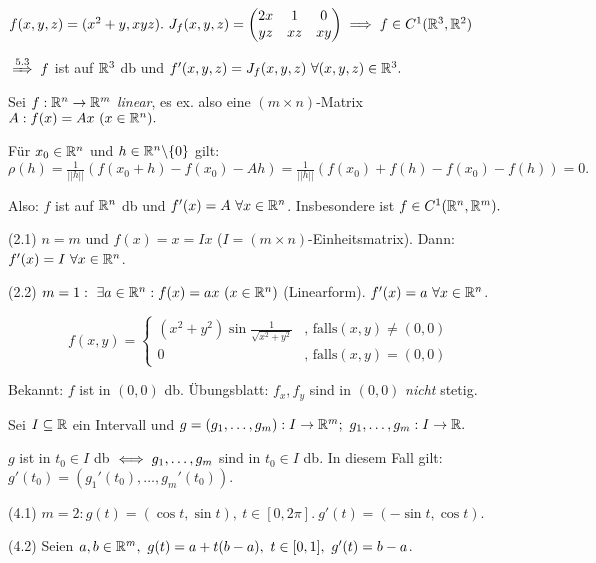\documentclass[a4paper,twoside,DIV15,BCOR12mm,chapterprefix=true,headings=twolinechapter]{scrbook}
\begin{document}
\begin{beispiele}
\item $f(x,y,z) = (x^2+y, xyz).\ J_f(x,y,z) = \begin{pmatrix}
2x & 1 & 0\\
yz & xz & xy\end{pmatrix} \implies f \in C^1(\mathbb{R}^3,\mathbb{R}^2)$

$\folgtnach{5.3} f$ ist auf $\mathbb{R}^3$ db und $f'(x,y,z) = J_f(x,y,z)\ \forall (x,y,z) \in \mathbb{R}^3.$

\item Sei $f:\mathbb{R}^n \to \mathbb{R}^m$ \emph{linear}, es ex. also eine $(m \times n)$-Matrix $A:f(x) = Ax\ (x \in \mathbb{R}^n).$

Für $x_0 \in \mathbb{R}^n$ und $h \in \mathbb{R}^n \backslash\{0\}$ gilt:\\
$\rho(h) = \frac{1}{||h||}(f(x_0+h) - f(x_0) - Ah) = \frac{1}{||h||}(f(x_0) + f(h) - f(x_0) - f(h)) = 0.$

Also: $f$ ist auf $\mathbb{R}^n$ db und $f'(x) = A\ \forall x \in \mathbb{R}^n$. Insbesondere ist $f \in C^1(\mathbb{R}^n,\mathbb{R}^m).$

\item[(2.1)] $n = m$ und $f(x) = x = Ix$ ($I = (m \times n)$-Einheitsmatrix). Dann: $f'(x) = I\ \forall x \in \mathbb{R}^n$.

\item[(2.2)] $m = 1:\ \exists a \in \mathbb{R}^n: f(x) = ax\ (x \in \mathbb{R}^n)$ (Linearform). $f'(x) = a\ \forall x \in \mathbb{R}^n$.

\item $$f(x,y) = \begin{cases}
(x^2+y^2) \sin \frac{1}{\sqrt{x^2+y^2}} & \text{, falls} (x,y) \ne (0,0)\\
0 & \text{, falls} (x,y) = (0,0)\end{cases}$$

Bekannt: $f$ ist in $(0,0)$ db. \"Ubungsblatt: $f_x,f_y$ sind in $(0,0)$ \emph{nicht} stetig.

\item Sei $I \subseteq \mathbb{R}$ ein Intervall und $g = (g_1,\ldots,g_m): I \to \MdR^m;\ g_1,\ldots,g_m: I \to \MdR.$

$g$ ist in $t_0 \in I$ db $\iff g_1,\ldots,g_m$ sind in $t_0 \in I$ db. In diesem Fall gilt: $g'(t_0) = (g_1'(t_0),\ldots,g_m'(t_0)).$

\item[(4.1)] $m = 2: g(t) = (\cos t,\sin t),\ t \in [0,2\pi].\ g'(t) = (-\sin t,\cos t).$
\item[(4.2)] Seien $a,b \in \MdR^m,\ g(t) = a+t(b-a),\ t \in [0,1],\ g'(t) = b-a$.
\end{beispiele}
\end{document}
